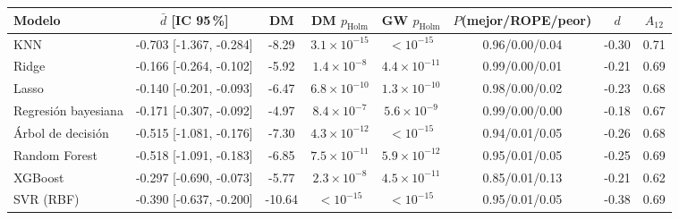 \begin{tabular}{lccccccc}
\toprule
Modelo & $\bar d$ [IC 95\,\%] & DM & DM $p_{\mathrm{Holm}}$ & GW $p_{\mathrm{Holm}}$ & $P$(mejor/ROPE/peor) & $d$ & $A_{12}$ \\
\midrule
KNN & -0.703 [-1.367, -0.284] & -8.29 & $3.1\times10^{-15}$ & $<10^{-15}$ & 0.96/0.00/0.04 & -0.30 & 0.71 \\
Ridge & -0.166 [-0.264, -0.102] & -5.92 & $1.4\times10^{-8}$ & $4.4\times10^{-11}$ & 0.99/0.00/0.01 & -0.21 & 0.69 \\
Lasso & -0.140 [-0.201, -0.093] & -6.47 & $6.8\times10^{-10}$ & $1.3\times10^{-10}$ & 0.98/0.00/0.02 & -0.23 & 0.68 \\
Regresión bayesiana & -0.171 [-0.307, -0.092] & -4.97 & $8.4\times10^{-7}$ & $5.6\times10^{-9}$ & 0.99/0.00/0.00 & -0.18 & 0.67 \\
Árbol de decisión & -0.515 [-1.081, -0.176] & -7.30 & $4.3\times10^{-12}$ & $<10^{-15}$ & 0.94/0.01/0.05 & -0.26 & 0.68 \\
Random Forest & -0.518 [-1.091, -0.183] & -6.85 & $7.5\times10^{-11}$ & $5.9\times10^{-12}$ & 0.95/0.01/0.05 & -0.25 & 0.69 \\
XGBoost & -0.297 [-0.690, -0.073] & -5.77 & $2.3\times10^{-8}$ & $4.5\times10^{-11}$ & 0.85/0.01/0.13 & -0.21 & 0.62 \\
SVR (RBF) & -0.390 [-0.637, -0.200] & -10.64 & $<10^{-15}$ & $<10^{-15}$ & 0.95/0.01/0.05 & -0.38 & 0.69 \\
\bottomrule
\end{tabular}
